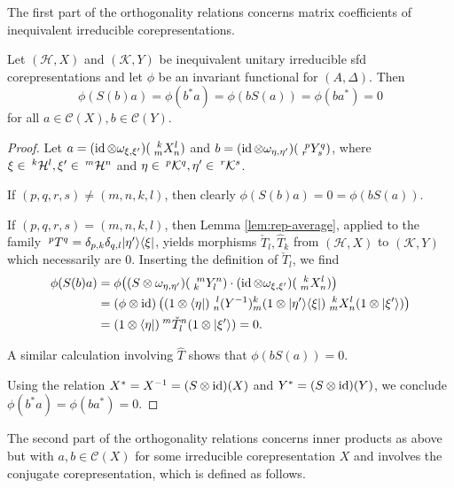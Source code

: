 The first part of the orthogonality relations concerns matrix
coefficients of inequivalent irreducible corepresentations.
\begin{Prop} \label{prop:rep-orthogonality-1}
  Let $(\mathcal{H},X)$ and $(\mathcal{K},Y)$ be inequivalent unitary
  irreducible sfd corepresentations and let
  $\phi$ be an invariant functional for $(A,\Delta)$.  Then
  \[\phi(S(b)a) =\phi(b^{*}a) = \phi(bS(a))=\phi(ba^{*})=0\] for all
  $a\in \mathcal{C}(X), b \in \mathcal{C}(Y)$.
\end{Prop}
\begin{proof}
  Let $a=(\id \otimes \omega_{\xi,\xi'})(\Gr{X}{k}{l}{m}{n})$ and
  $b=(\id \otimes \omega_{\eta,\eta'})(\Gr{Y}{p}{q}{r}{s})$, where
  $\xi \in \Gru{\mathcal{H}}{k}{l}, \xi' \in \Gru{\mathcal{H}}{m}{n}$
  and $\eta \in \Gru{\mathcal{K}}{p}{q}, \eta' \in
  \Gru{\mathcal{K}}{r}{s}$. 
  
  If $(p,q,r,s) \neq (m,n,k,l)$, then clearly $\phi(S(b)a) = 0 = \phi(bS(a))$.
  
   If $(p,q,r,s) = (m,n,k,l)$,  then Lemma \ref{lem:rep-average}, applied to the 
  family $\Gru{T}{p}{q}= \delta_{p,k}\delta_{q,l}
  |\eta'\rangle\langle\xi|$, yields  morphisms $\check{T}_l,\hat{T}_k$
  from $(\mathcal{H},X)$ to $(\mathcal{K},Y)$ which necessarily are
  $0$. Inserting the definition of $\check{T}_l$, we find
  \begin{align*}
    \phi(S(b)a) &= \phi\big((S \otimes
    \omega_{\eta,\eta'})(\Gr{Y}{m}{n}{k}{l}) \cdot (\id \otimes
    \omega_{\xi,\xi'})(\Gr{X}{k}{l}{m}{n})\big) \\ &= (\phi \otimes
    \id)\left((1\otimes \langle\eta|) \Gr{(Y^{-1})}{l}{k}{n}{m}(1 \otimes
      |\eta'\rangle\langle \xi|)
      \Gr{X}{k}{l}{m}{n}(1\otimes |\xi'\rangle)\right) 
   \\ &= (1\otimes \langle \eta|) \Gru{\check{T}_l}{m}{n}(1\otimes |\xi'\rangle) = 0.
  \end{align*}%
  
  A similar calculation involving $\hat{T}$ shows that
  $\phi(bS(a))=0$.  
  
  Using the relation $X^{*}=X^{-1}=(S\otimes
  \id)(X)$ and $Y^{*}=(S\otimes \id)(Y)$, we conclude
  $\phi(b^{*}a)=\phi(ba^{*})=0$.
\end{proof}

The second part of the orthogonality relations concerns inner products
as above but with $a,b\in \mathcal{C}(X)$ for some irreducible
corepresentation  $X$  and involves the conjugate corepresentation,
which is defined as follows.

